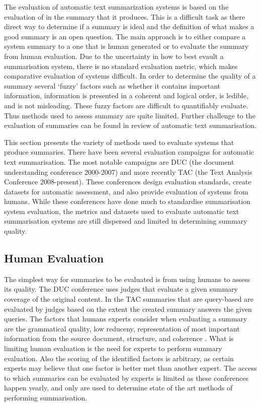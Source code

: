 The evaluation of automatic text summarization systems is based on the evaluation of in the summary that it produces. This is a difficult task as there direct way to determine if a summary is ideal and the definition of what makes a good summary is an open question. The main approach is to either compare a system summary to a one that is human generated or to evaluate the summary from human evaluation. Due to the uncertainty in how to best evault a summarisation system, there is no standard evaluation metric, which makes comparative evaluation of systems difficult. In order to determine the quality of a summary several ‘fuzzy’ factors such as whether it contains important information, information is presented in a coherent and logical order, is ledible, and is not misleading. These fuzzy factors are difficult to quantifiably evaluate. Thus methods used to assess summary are quite limited.  Further challenge to the evaluation of summaries can be found in \citet{oruasan2019automatic} review of automatic text summarisation.

This section presents the variety of methods used to evaluate systems that produce summaries. There have been several evaluation campaigns for automatic text summarisation. The most notable campaigns are DUC (the document understanding conference 2000-2007) and more recently TAC (the Text Analysis Conference 2008-present). These conferences design evaluation standards, create datasets for automatic assessment, and also provide evaluation of systems from humans. While these conferences have done much to standardise summarisation system evaluation, the metrics and datasets used to evaluate automatic text summarisation systems are still dispersed and limited in determining summary quality.

\subsection{Human Evaluation}
\label{subsec:2.5.1}
The simplest way for summaries to be evaluated is from using humans to assess its quality.  The DUC conference uses judges that evaluate a given summary coverage of the original content. In the TAC summaries that are query-based are evaluated by judges based on the extent the created summary answers the given queries. The factors that humans experts consider when evaluating a summary are the grammatical quality, low reduceny, representation of most important information from the source document, structure, and coherence \citep{saggion2013automatic}. What is limiting human evaluation is the need for experts to perform summary evaluation. Also the scoring of the identified factors is arbitrary, as certain experts may believe that one factor is better met than another expert. The access to which summaries can be evaluated by experts is limited as these conferences happen yearly, and only are used to determine state of the art methods of performing summarisation.

